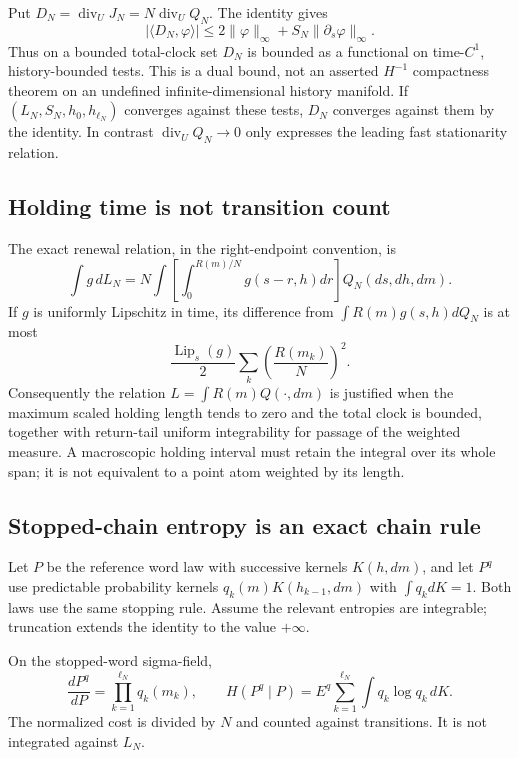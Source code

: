 Put $D_N=\operatorname{div}_U J_N=N\operatorname{div}_UQ_N$. The identity gives
\[
 |\langle D_N,\varphi\rangle|
 \le2\|\varphi\|_\infty+S_N\|\partial_s\varphi\|_\infty.
\]
Thus on a bounded total-clock set $D_N$ is bounded as a functional on time-$C^1$, history-bounded tests. This is a dual bound, not an asserted $H^{-1}$ compactness theorem on an undefined infinite-dimensional history manifold. If $(L_N,S_N,h_0,h_{\ell_N})$ converges against these tests, $D_N$ converges against them by the identity. In contrast $\operatorname{div}_UQ_N\to0$ only expresses the leading fast stationarity relation.

\subsection{Holding time is not transition count}
The exact renewal relation, in the right-endpoint convention, is
\[
 \int g\,dL_N=N\int\left[\int_0^{R(m)/N}g(s-r,h)dr\right]Q_N(ds,dh,dm).
\]
If $g$ is uniformly Lipschitz in time, its difference from $\int R(m)g(s,h)dQ_N$ is at most
\[
 \frac{\operatorname{Lip}_s(g)}2\sum_k\left(\frac{R(m_k)}N\right)^2.
\]
Consequently the relation $L=\int R(m)Q(\cdot,dm)$ is justified when the maximum scaled holding length tends to zero and the total clock is bounded, together with return-tail uniform integrability for passage of the weighted measure. A macroscopic holding interval must retain the integral over its whole span; it is not equivalent to a point atom weighted by its length.

\subsection{Stopped-chain entropy is an exact chain rule}
Let $P$ be the reference word law with successive kernels $K(h,dm)$, and let $P^q$ use predictable probability kernels $q_k(m)K(h_{k-1},dm)$ with $\int q_kdK=1$. Both laws use the same stopping rule. Assume the relevant entropies are integrable; truncation extends the identity to the value $+\infty$.

\begin{theorem}
\label{thm:r33-a3-entropy}
On the stopped-word sigma-field,
\[
 \frac{dP^q}{dP}=\prod_{k=1}^{\ell_N}q_k(m_k),\qquad
 H(P^q\mid P)=E^q\sum_{k=1}^{\ell_N}\int q_k\log q_k\,dK.
\]
The normalized cost is divided by $N$ and counted against transitions. It is not integrated against $L_N$.
\end{theorem}

